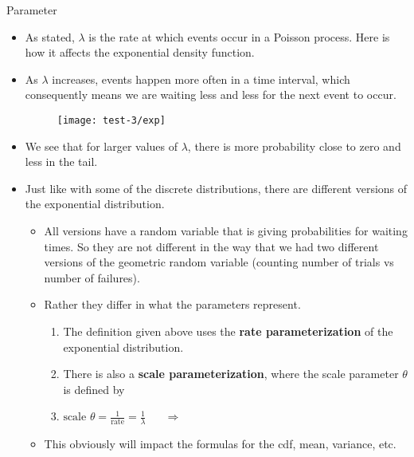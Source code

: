 \documentclass{article}
\begin{document}
Parameter\bigskip
\begin{itemize}
    \item As stated, $\lambda$ is the rate at which events occur in a Poisson process. Here is how it affects the exponential density function.
    \item As $\lambda$ increases, events happen more often in a time interval, which consequently means we are waiting less and less for the next event to occur.
    \begin{figure}[H]
        \center\texttt{[image: test-3/exp]}
    \end{figure}
    \item[] We see that for larger values of $\lambda$, there is more probability close to zero and less in the tail.
    \item Just like with some of the discrete distributions, there are different versions of the exponential distribution.
    \begin{itemize}
        \item All versions have a random variable that is giving probabilities for waiting times. So they are not different in the way that we had two different versions of the geometric random variable (counting number of trials vs number of failures).
        \item Rather they differ in what the parameters represent.
        \begin{enumerate}
            \item The definition given above uses the \textbf{rate parameterization} of the exponential distribution.
            \item There is also a \textbf{scale parameterization}, where the scale parameter $\theta$ is defined by
            \item[] $\displaystyle \text{scale } \theta = \frac{1}{\text{rate}} = \frac{1}{\lambda} \hspace{20pt}\Longrightarrow \hspace{20pt}$
        \end{enumerate}
        \item This obviously will impact the formulas for the cdf, mean, variance, etc.
    \end{itemize}
\end{itemize}

\newpage
\end{document}
